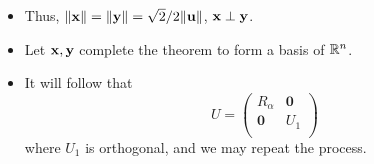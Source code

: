 \documentclass[../../notes.tex]{subfiles}
\begin{document}
\begin{itemize}
\begin{itemize}
        \item Thus, $\norm{\mathbf{x}}=\norm{\mathbf{y}}=\sqrt{2}/2\norm{\mathbf{u}}$, $\mathbf{x}\perp\mathbf{y}$.
        \item Let $\mathbf{x},\mathbf{y}$ complete the theorem to form a basis of $\mathbb{R}^n$.
        \item It will follow that
        \begin{equation*}
            U =
            \begin{pmatrix}
                R_\alpha & \bm{0}\\
                \bm{0} & U_1\\
            \end{pmatrix}
        \end{equation*}
        where $U_1$ is orthogonal, and we may repeat the process.
    \end{itemize}
\end{itemize}
\end{document}
